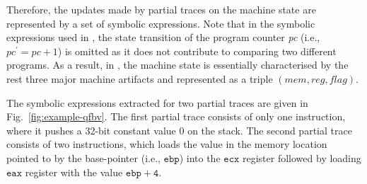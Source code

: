 Therefore, the updates made by partial traces on the machine state are represented by a set of symbolic expressions. %
Note that in the symbolic expressions used in \tool, the state transition of the program counter \emph{pc} (i.e., $pc^\prime = pc+1$) is omitted as it does not contribute to comparing two different programs.
As a result, in \tool, the machine state is essentially characterised by the rest three major machine artifacts and represented as a triple $(mem, reg, flag)$.


The symbolic expressions extracted for two partial traces are given in Fig.~\ref{fig:example-qfbv}.
The first partial trace consists of only one instruction, where it pushes a 32-bit constant value 0 on the stack. The second partial trace consists of two instructions, which loads the value in the memory location pointed to by the base-pointer (i.e.,  $\mathtt{ebp}$) into the  $\mathtt{ecx}$ register followed by loading $\mathtt{eax}$ register with the value  $\mathtt{ebp+4}$.



